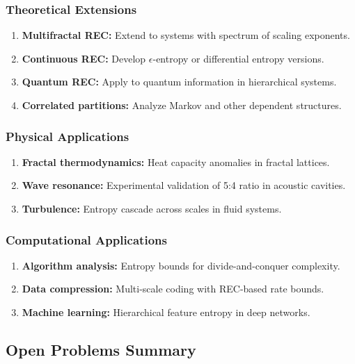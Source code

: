 \documentclass[11pt,a4paper]{article}
\theoremstyle{definition}
\theoremstyle{remark}
\begin{document}
\subsubsection{Theoretical Extensions}

\begin{enumerate}
    \item \textbf{Multifractal REC:} Extend to systems with spectrum of scaling exponents.
    \item \textbf{Continuous REC:} Develop $\epsilon$-entropy or differential entropy versions.
    \item \textbf{Quantum REC:} Apply to quantum information in hierarchical systems.
    \item \textbf{Correlated partitions:} Analyze Markov and other dependent structures.
\end{enumerate}

\subsubsection{Physical Applications}

\begin{enumerate}
    \item \textbf{Fractal thermodynamics:} Heat capacity anomalies in fractal lattices.
    \item \textbf{Wave resonance:} Experimental validation of 5:4 ratio in acoustic cavities.
    \item \textbf{Turbulence:} Entropy cascade across scales in fluid systems.
\end{enumerate}

\subsubsection{Computational Applications}

\begin{enumerate}
    \item \textbf{Algorithm analysis:} Entropy bounds for divide-and-conquer complexity.
    \item \textbf{Data compression:} Multi-scale coding with REC-based rate bounds.
    \item \textbf{Machine learning:} Hierarchical feature entropy in deep networks.
\end{enumerate}

\subsection{Open Problems Summary}
\end{document}
